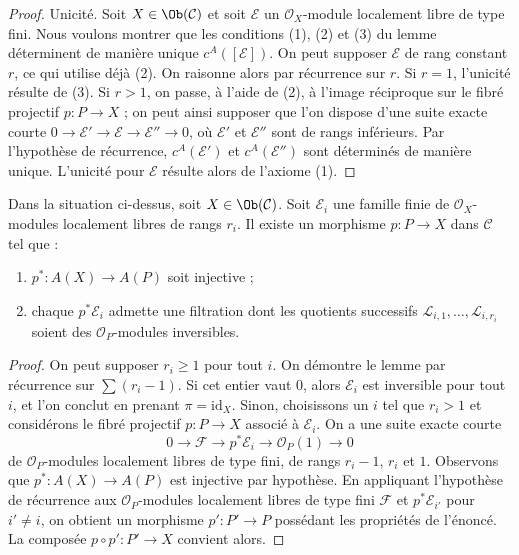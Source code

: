 \begin{proof}
\medskip\noindent
Unicité. Soit $X \in \Ob(\mathcal{C})$ et soit $\mathcal{E}$
un $\mathcal{O}_X$-module localement libre de type fini. Nous voulons montrer
que les conditions (1), (2) et (3) du lemme déterminent de manière unique
$c^A([\mathcal{E}])$. On peut supposer $\mathcal{E}$
de rang constant $r$, ce qui utilise déjà (2). On raisonne alors par récurrence sur $r$.
Si $r = 1$, l'unicité résulte de (3).
Si $r > 1$, on passe, à l'aide de (2), à l'image réciproque sur le fibré projectif $p : P \to X$ ;
on peut ainsi supposer que l'on dispose d'une suite exacte courte
$0 \to \mathcal{E}' \to \mathcal{E} \to \mathcal{E}'' \to 0$,
où $\mathcal{E}'$ et $\mathcal{E}''$ sont de rangs inférieurs.
Par l'hypothèse de récurrence, $c^A(\mathcal{E}')$ et $c^A(\mathcal{E}'')$
sont déterminés de manière unique. L'unicité pour $\mathcal{E}$ résulte alors
de l'axiome (1).
\end{proof}

\begin{lemma}
\label{lemma-splitting-principle}
Dans la situation ci-dessus, soit $X \in \Ob(\mathcal{C})$. Soit $\mathcal{E}_i$
une famille finie de $\mathcal{O}_X$-modules localement libres de rangs $r_i$.
Il existe un morphisme $p : P \to X$ dans $\mathcal{C}$ tel que :
\begin{enumerate}
\item $p^* : A(X) \to A(P)$ soit injective ;
\item chaque $p^*\mathcal{E}_i$ admette une filtration dont les quotients successifs
$\mathcal{L}_{i, 1}, \ldots, \mathcal{L}_{i, r_i}$
soient des $\mathcal{O}_P$-modules inversibles.
\end{enumerate}
\end{lemma}

\begin{proof}
On peut supposer $r_i \geq 1$ pour tout $i$. On démontre le lemme par récurrence
sur $\sum (r_i - 1)$. Si cet entier vaut $0$, alors $\mathcal{E}_i$
est inversible pour tout $i$, et l'on conclut en prenant $\pi = \text{id}_X$.
Sinon, choisissons un $i$ tel que $r_i > 1$ et considérons
le fibré projectif $p : P \to X$ associé à $\mathcal{E}_i$.
On a une suite exacte courte
$$
0 \to \mathcal{F} \to p^*\mathcal{E}_i \to \mathcal{O}_P(1) \to 0
$$
de $\mathcal{O}_P$-modules localement libres de type fini, de rangs $r_i - 1$,
$r_i$ et $1$. Observons que $p^* : A(X) \to A(P)$ est injective
par hypothèse. En appliquant l'hypothèse de récurrence aux
$\mathcal{O}_P$-modules localement libres de type fini $\mathcal{F}$ et $p^*\mathcal{E}_{i'}$
pour $i' \not = i$, on obtient un morphisme $p' : P' \to P$ possédant
les propriétés de l'énoncé. La composée
$p \circ p' : P' \to X$ convient alors.
\end{proof}

